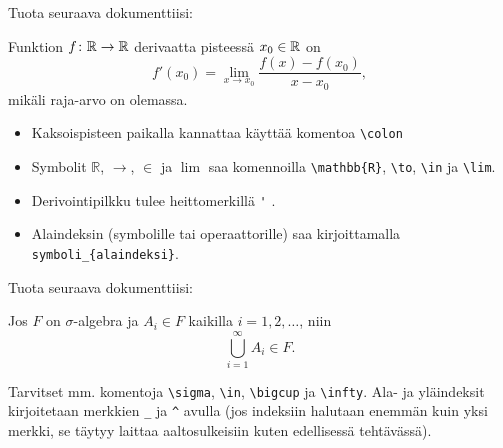 \begin{fframe}
    \begin{harj}
        \label{rajaArvo}
        Tuota seuraava dokumenttiisi:
        \begin{sample}
            Funktion \(f\colon \mathbb{R}\to \mathbb{R}\) derivaatta pisteessä \(x_0\in\mathbb{R}\) on
            \[
                f'(x_0)=\lim_{x\to x_0}\frac{f(x)-f(x_0)}{x-x_0},
            \]
            mikäli raja-arvo on olemassa.
        \end{sample}
        \begin{itemize}
            \item Kaksoispisteen paikalla kannattaa käyttää komentoa \lstinline-\colon-
            \item Symbolit \(\mathbb{R}\), \(\to\), \(\in\) ja \(\lim\) saa komennoilla \lstinline-\mathbb{R}-, \lstinline-\to-, \lstinline-\in- ja \lstinline-\lim-.
            \item Derivointipilkku tulee heittomerkillä \lstinline-'- .
            \item Alaindeksin (symbolille tai operaattorille) saa kirjoittamalla \lstinline-symboli_{alaindeksi}-.
        \end{itemize}
    \end{harj}
\end{fframe}

\begin{fframe}
    \begin{harj}
        Tuota seuraava dokumenttiisi:
        \begin{sample}
            Jos \(F\) on \(\sigma\)-algebra ja \(A_i\in F\) kaikilla \(i= 1,2,\dots\), niin 
            \[
                \bigcup_{i=1}^{\infty} A_i\in F.
            \]
        \end{sample}
        Tarvitset mm. komentoja \lstinline-\sigma-, \lstinline-\in-, \lstinline-\bigcup- ja \lstinline-\infty-. Ala- ja yläindeksit kirjoitetaan merkkien \lstinline-_- ja \lstinline-^- avulla (jos indeksiin halutaan enemmän kuin yksi merkki, se täytyy laittaa aaltosulkeisiin kuten edellisessä tehtävässä). 
    \end{harj}
\end{fframe}

